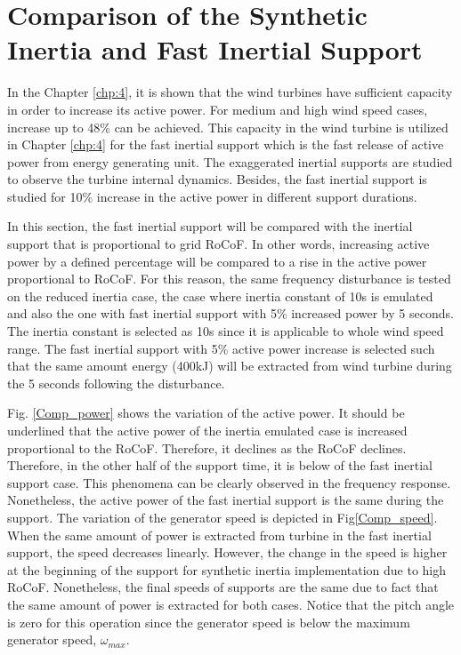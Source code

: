 \section{Comparison of the Synthetic Inertia and Fast Inertial Support}
In the Chapter \ref{chp:4}, it is shown that the wind turbines have sufficient capacity in order to increase its active power. For medium and high wind speed cases, increase up to 48\% can be achieved. This capacity in the wind turbine is utilized in Chapter \ref{chp:4} for the fast inertial support which is the fast release of active power from energy generating unit. The exaggerated inertial supports are studied to observe the turbine internal dynamics. Besides, the fast inertial support is studied for 10\% increase in the active power in different support durations.\par
In this section, the fast inertial support will be compared with the inertial support that is proportional to grid RoCoF. In other words, increasing active power by a defined percentage will be compared to a rise in the active power proportional to RoCoF. For this reason, the same frequency disturbance is tested on the reduced inertia case, the case where inertia constant of 10s is emulated and also the one with fast inertial support with 5\% increased power by 5 seconds. The inertia constant is selected as 10s since it is applicable to whole wind speed range. The fast inertial support with 5\% active power increase is selected such that the same amount energy (400kJ) will be extracted from wind turbine during the 5 seconds following the disturbance. \par 
Fig. \ref{Comp_power} shows the variation of the active power. It should be underlined that the active power of the inertia emulated case is increased proportional to the RoCoF. Therefore, it declines as the RoCoF declines. Therefore, in the other half of the support time, it is below of the fast inertial support case. This phenomena can be clearly observed in the frequency response. Nonetheless, the active power of the fast inertial support is the same during the support. The variation of the generator speed is depicted in Fig\ref{Comp_speed}. When the same amount of power is extracted from turbine in the fast inertial support, the speed decreases linearly. However, the change in the speed is higher at the beginning of the support for synthetic inertia implementation due to high RoCoF. Nonetheless, the final speeds of supports are the same due to fact that the same amount of power is extracted for both cases. Notice that the pitch angle is zero for this operation since the generator speed is below the maximum generator speed, $\omega_{max}$.\par 

